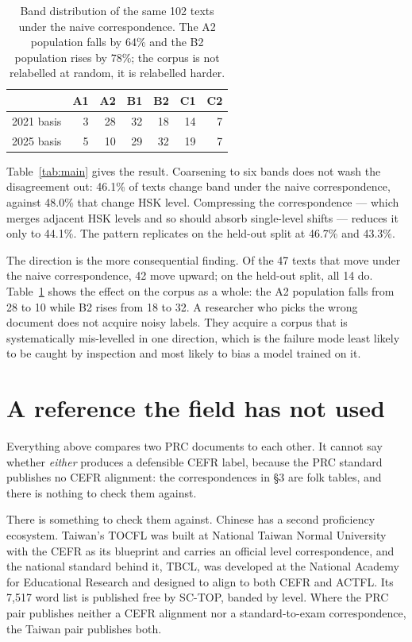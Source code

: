 \documentclass[11pt]{article}
\begin{document}
\begin{table}[t]
\centering
\small
\begin{tabular}{lrrrrrr}
\toprule
& \textbf{A1} & \textbf{A2} & \textbf{B1} & \textbf{B2} & \textbf{C1} & \textbf{C2} \\
\midrule
2021 basis & 3 & 28 & 32 & 18 & 14 & 7 \\
2025 basis & 5 & 10 & 29 & 32 & 19 & 7 \\
\bottomrule
\end{tabular}
\caption{Band distribution of the same 102 texts under the naive
correspondence. The A2 population falls by 64\% and the B2 population rises by
78\%; the corpus is not relabelled at random, it is relabelled harder.}
\label{tab:dist}
\end{table}

Table~\ref{tab:main} gives the result. Coarsening to six bands does not wash
the disagreement out: 46.1\% of texts change band under the naive
correspondence, against 48.0\% that change HSK level. Compressing the
correspondence --- which merges adjacent HSK levels and so should absorb
single-level shifts --- reduces it only to 44.1\%. The pattern replicates on
the held-out split at 46.7\% and 43.3\%.

The direction is the more consequential finding. Of the 47 texts that move
under the naive correspondence, 42 move upward; on the held-out split, all 14
do. Table~\ref{tab:dist} shows the effect on the corpus as a whole: the A2
population falls from 28 to 10 while B2 rises from 18 to 32. A researcher who
picks the wrong document does not acquire noisy labels. They acquire a corpus
that is systematically mis-levelled in one direction, which is the failure mode
least likely to be caught by inspection and most likely to bias a model trained
on it.

\section{A reference the field has not used}
\label{sec:tw}

Everything above compares two PRC documents to each other. It cannot say
whether \emph{either} produces a defensible CEFR label, because the PRC
standard publishes no CEFR alignment: the correspondences in §3 are folk
tables, and there is nothing to check them against.

There is something to check them against. Chinese has a second proficiency
ecosystem. Taiwan's TOCFL was built at National Taiwan Normal University with
the CEFR as its blueprint and carries an official level correspondence, and the
national standard behind it, TBCL, was developed at the National Academy for
Educational Research and designed to align to both CEFR and ACTFL. Its 7{,}517
word list is published free by SC-TOP, banded by level. Where the PRC pair
publishes neither a CEFR alignment nor a standard-to-exam correspondence,
the Taiwan pair publishes both.
\end{document}
